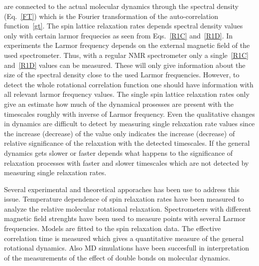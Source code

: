 \documentclass[aps,prl,superscriptaddress,twocolumn]{revtex4}
\begin{document}
are connected to the actual molecular dynamics through the spectral density (Eq.~\ref{FT}) which is the Fourier transformation
of the auto-correlation function~\ref{gt}. The spin lattice relaxation rates depends spectral density values only 
with certain larmor frequecies as seen from Eqs.~\ref{R1C} and~\ref{R1D}. In experiments the Larmor frequency 
depends on the external magnetic field of the used spectrometer. Thus, with a regular NMR spectrometer only
a single~\ref{R1C} and~\ref{R1D} values can be measured. These will only give information about the size
of the spectral density close to the used Larmor frequencies. However, to detect the whole rotational
correlation function one should have information with all relevant larmor frequency values. 
The single spin lattice relaxation rates only give an estimate how much of the dynamical prosesses
are present with the timescales roughly with inverse of Larmor frequency. Even the qualitative
changes in dynamics are difficult to detect by measuring single relaxation rate values since the
increase (decrease) of the value only indicates the increase (decrease) of relative significance 
of the relaxation with the detected timescales. If the general dynamics gets slower or faster depends
what happens to the significance of relaxation processes with faster and slower timescales which 
are not detected by measuring single relaxation rates.

Several experimental and theoretical apporaches has been use to address this issue.
Temperature dependence of spin relaxation rates have been measured to analyze the relative 
molecular rotational relaxation. 
Spectrometers with different magnetic field strenghts have been used to measure points with 
several Larmor frequencies.
Models are fitted to the spin relaxation data.
The effective correlation time is measured which gives a quantitative measure of the general 
rotational dynamics. Also MD simulations have been succesfull in interpretation of the 
measurements of the effect of double bonds on molecular dynamics. 
\end{document}
